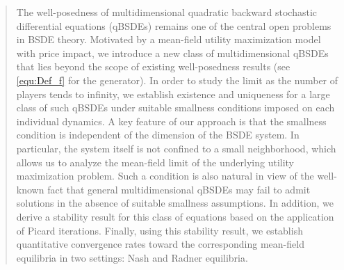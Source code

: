 \documentclass[10pt,a4paper]{article}
\theoremstyle{plain}
\theoremstyle{definition}
\numberwithin{equation}{section}
\begin{document}
\begin{abstract}





The well-posedness of multidimensional quadratic backward stochastic differential equations (qBSDEs) remains one of the central open problems in BSDE theory.
Motivated by a mean-field utility maximization model with price impact, we introduce a new class of multidimensional qBSDEs that lies beyond the scope of existing well-posedness results
(see \eqref{equ:Def_f} for the generator). In order to study the limit as the number of players tends to infinity, we establish existence and uniqueness for a large class of such qBSDEs under suitable smallness conditions imposed on each individual dynamics. A key feature of our approach is that the smallness condition is independent of the dimension of the BSDE system. In particular, the system itself is not confined to a small neighborhood, which allows us to analyze the mean-field limit of the underlying utility maximization problem. Such a condition is also natural in view of the well-known fact that general multidimensional qBSDEs may fail to admit solutions in the absence of suitable smallness assumptions.
In addition, we derive a stability result for this class of equations based on the application of Picard iterations. Finally, using this stability result, we establish quantitative convergence rates toward the corresponding mean-field equilibria in two settings: Nash and Radner equilibria.\\


\end{abstract}
\end{document}
